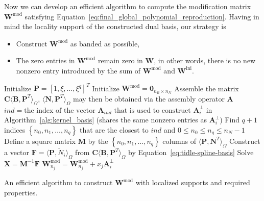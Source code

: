 Now we can develop an efficient algorithm to compute the modification matrix $\mathbf{W}^\text{mod}$ satisfying Equation~\eqref{eq:final_global_polynomial_reproduction}. Having in mind the locality support of the constructed dual basis, our strategy is
\begin{itemize}
	\item Construct $\mathbf{W}^\text{mod}$ as banded as possible,
	\item The zero entries in $\mathbf{W}^\text{mod}$ remain zero in $\mathbf{W}$, in other words, there is no new nonzero entry introduced by the sum of $\mathbf{W}^\text{mod}$ and $\mathbf{W}^\text{ini}$.
\end{itemize}
\begin{algorithm}[H]\label{alg:modification_weight}

	\BlankLine
	Initialize $\mathbf{P}=\left[{1, \xi,\dots,\xi^q}\right]^T$\;
	Initialize $\mathbf{W}^\text{mod}=\mathbf{0}_{n_B \times n_N }$\;
	Assemble the matrix $\mathbf{C}\langle{\mathbf{B},\mathbf{P}^T}\rangle_\Omega$, $\langle{\mathbf{N},\mathbf{P}^T}\rangle_\Omega$ may then be obtained via the assembly operator $\mathbf{A}$\;
	{
	$ind =\text{the index of the vector $\mathbf{A}_{ind}$ that is used to construct $\mathbf{A}^\perp_i$}$ in Algorithm~\ref{alg:kernel_basis} (shares the same nonzero entries as $\mathbf{A}^\perp_i$)\;
	Find $q+1$ indices $\left\{{n_0,n_1,\dots,n_{q}}\right\}$ that are the closest to $ind$ and $0\leq{}n_0\leq{}n_q\leq{}n_N-1$\;
	Define a square matrix $\mathbf{M}$ by the $\left\{{n_0,n_1,\dots,n_{q}}\right\}$ columns of $\langle{\mathbf{P},\mathbf{N}^T}\rangle_\Omega$\;
	Construct a vector $\mathbf{F}=\langle \mathbf{P}, \tilde{N}_i \rangle_\Omega$ from $\mathbf{C}\langle{\mathbf{B},\mathbf{P}^T}\rangle_\Omega$ by Equation~\eqref{eq:tidle-spline-basis}\;
	Solve $\mathbf{X}=\mathbf{M}^{-1}\mathbf{F}$\;
	{
		$\mathbf{W}^\text{mod}_{n_j}=\mathbf{W}^\text{mod}_{n_j}+x_j\mathbf{A}^\perp_i$\;
	}
	}
	\caption{An efficient algorithm to construct $\mathbf{W}^\text{mod}$ with localized supports and required properties.}
\end{algorithm}

